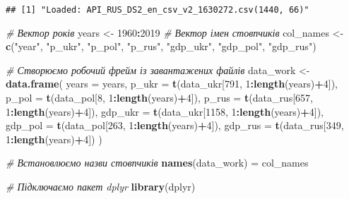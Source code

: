 \documentclass[
]{article}
\newenvironment{Shaded}{\begin{snugshade}}{\end{snugshade}}
\newcommand{\CommentTok}[1]{\textcolor[rgb]{0.56,0.35,0.01}{\textit{#1}}}
\newcommand{\DataTypeTok}[1]{\textcolor[rgb]{0.13,0.29,0.53}{#1}}
\newcommand{\DecValTok}[1]{\textcolor[rgb]{0.00,0.00,0.81}{#1}}
\newcommand{\KeywordTok}[1]{\textcolor[rgb]{0.13,0.29,0.53}{\textbf{#1}}}
\newcommand{\NormalTok}[1]{#1}
\newcommand{\OperatorTok}[1]{\textcolor[rgb]{0.81,0.36,0.00}{\textbf{#1}}}
\newcommand{\StringTok}[1]{\textcolor[rgb]{0.31,0.60,0.02}{#1}}
\begin{document}
\begin{verbatim}
## [1] "Loaded: API_RUS_DS2_en_csv_v2_1630272.csv(1440, 66)"
\end{verbatim}

\begin{Shaded}
\begin{Highlighting}[]
\CommentTok{# Вектор років}
\NormalTok{years <-}\StringTok{ }\DecValTok{1960}\OperatorTok{:}\DecValTok{2019}
\CommentTok{# Вектор імен стовпчиків}
\NormalTok{col_names <-}\StringTok{ }\KeywordTok{c}\NormalTok{(}\StringTok{"year"}\NormalTok{, }\StringTok{"p_ukr"}\NormalTok{, }\StringTok{"p_pol"}\NormalTok{, }\StringTok{"p_rus"}\NormalTok{, }
               \StringTok{"gdp_ukr"}\NormalTok{, }\StringTok{"gdp_pol"}\NormalTok{, }\StringTok{"gdp_rus"}\NormalTok{)}

\CommentTok{# Створюємо робочий фрейм із завантажених файлів}
\NormalTok{data_work <-}\StringTok{ }\KeywordTok{data.frame}\NormalTok{(}
  \DataTypeTok{years =}\NormalTok{ years,}
  \DataTypeTok{p_ukr =} \KeywordTok{t}\NormalTok{(data_ukr[}\DecValTok{791}\NormalTok{, }\DecValTok{1}\OperatorTok{:}\KeywordTok{length}\NormalTok{(years)}\OperatorTok{+}\DecValTok{4}\NormalTok{]),}
  \DataTypeTok{p_pol =} \KeywordTok{t}\NormalTok{(data_pol[}\DecValTok{8}\NormalTok{, }\DecValTok{1}\OperatorTok{:}\KeywordTok{length}\NormalTok{(years)}\OperatorTok{+}\DecValTok{4}\NormalTok{]),}
  \DataTypeTok{p_rus =} \KeywordTok{t}\NormalTok{(data_rus[}\DecValTok{657}\NormalTok{, }\DecValTok{1}\OperatorTok{:}\KeywordTok{length}\NormalTok{(years)}\OperatorTok{+}\DecValTok{4}\NormalTok{]),}
  \DataTypeTok{gdp_ukr =} \KeywordTok{t}\NormalTok{(data_ukr[}\DecValTok{1158}\NormalTok{, }\DecValTok{1}\OperatorTok{:}\KeywordTok{length}\NormalTok{(years)}\OperatorTok{+}\DecValTok{4}\NormalTok{]),}
  \DataTypeTok{gdp_pol =} \KeywordTok{t}\NormalTok{(data_pol[}\DecValTok{263}\NormalTok{, }\DecValTok{1}\OperatorTok{:}\KeywordTok{length}\NormalTok{(years)}\OperatorTok{+}\DecValTok{4}\NormalTok{]),}
  \DataTypeTok{gdp_rus =} \KeywordTok{t}\NormalTok{(data_rus[}\DecValTok{349}\NormalTok{, }\DecValTok{1}\OperatorTok{:}\KeywordTok{length}\NormalTok{(years)}\OperatorTok{+}\DecValTok{4}\NormalTok{])}
\NormalTok{)}

\CommentTok{# Встановлюємо назви стовпчиків}
\KeywordTok{names}\NormalTok{(data_work) =}\StringTok{ }\NormalTok{col_names}
\end{Highlighting}
\end{Shaded}

\begin{Shaded}
\begin{Highlighting}[]
\CommentTok{# Підключаємо пакет dplyr}
\KeywordTok{library}\NormalTok{(dplyr)}
\end{Highlighting}
\end{Shaded}
\end{document}
